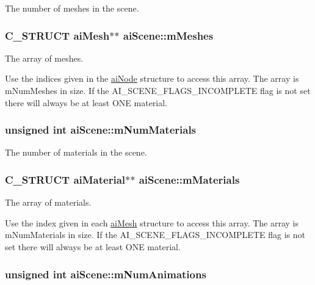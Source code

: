 The number of meshes in the scene. \hypertarget{structai_scene_d1c7000f0f28ea747868db9f94d32a3d}{
\subsubsection[mMeshes]{\setlength{\rightskip}{0pt plus 5cm}C\_\-STRUCT {\bf aiMesh}$\ast$$\ast$ {\bf aiScene::mMeshes}}}
\label{structai_scene_d1c7000f0f28ea747868db9f94d32a3d}


The array of meshes.

Use the indices given in the \hyperlink{structai_node}{aiNode} structure to access this array. The array is mNumMeshes in size. If the AI\_\-SCENE\_\-FLAGS\_\-INCOMPLETE flag is not set there will always be at least ONE material. \hypertarget{structai_scene_4277d8bffe8b8f568098af6c31d042b7}{
\subsubsection[mNumMaterials]{\setlength{\rightskip}{0pt plus 5cm}unsigned int {\bf aiScene::mNumMaterials}}}
\label{structai_scene_4277d8bffe8b8f568098af6c31d042b7}


The number of materials in the scene. \hypertarget{structai_scene_52bc7089a5b943ad7c7c386e616df35e}{
\subsubsection[mMaterials]{\setlength{\rightskip}{0pt plus 5cm}C\_\-STRUCT {\bf aiMaterial}$\ast$$\ast$ {\bf aiScene::mMaterials}}}
\label{structai_scene_52bc7089a5b943ad7c7c386e616df35e}


The array of materials.

Use the index given in each \hyperlink{structai_mesh}{aiMesh} structure to access this array. The array is mNumMaterials in size. If the AI\_\-SCENE\_\-FLAGS\_\-INCOMPLETE flag is not set there will always be at least ONE material. \hypertarget{structai_scene_a2af030ec218ead0dc062b6a96a7471a}{
\subsubsection[mNumAnimations]{\setlength{\rightskip}{0pt plus 5cm}unsigned int {\bf aiScene::mNumAnimations}}}
\label{structai_scene_a2af030ec218ead0dc062b6a96a7471a}


